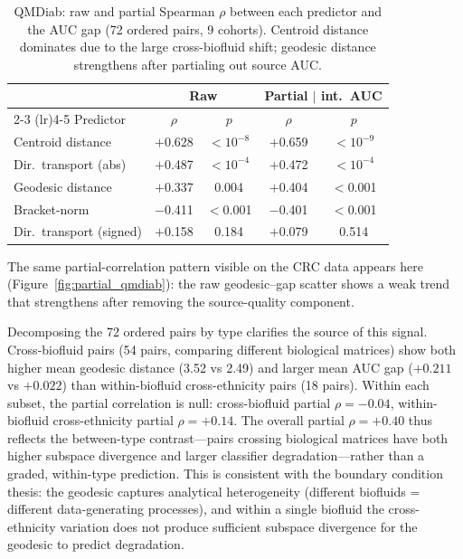 \documentclass{article}
\begin{document}
\begin{table}[t]
\centering
\caption{QMDiab: raw and partial Spearman $\rho$ between each predictor and the AUC gap (72 ordered pairs, 9 cohorts). Centroid distance dominates due to the large cross-biofluid shift; geodesic distance strengthens after partialing out source AUC.}
\label{tab:qmdiab}
\begin{tabular}{lcccc}
\toprule
 & \multicolumn{2}{c}{Raw} & \multicolumn{2}{c}{Partial $|$ int.\ AUC} \\
\cmidrule(lr){2-3} \cmidrule(lr){4-5}
Predictor & $\rho$ & $p$ & $\rho$ & $p$ \\
\midrule
Centroid distance        & $+$0.628 & $<10^{-8}$ & $+$0.659 & $<10^{-9}$ \\
Dir.\ transport (abs)    & $+$0.487 & $<10^{-4}$ & $+$0.472 & $<10^{-4}$ \\
Geodesic distance        & $+$0.337 & 0.004      & $+$0.404 & $<$0.001 \\
Bracket-norm             & $-$0.411 & $<$0.001   & $-$0.401 & $<$0.001 \\
Dir.\ transport (signed) & $+$0.158 & 0.184      & $+$0.079 & 0.514 \\
\bottomrule
\end{tabular}
\end{table}

The same partial-correlation pattern visible on the CRC data appears here (Figure~\ref{fig:partial_qmdiab}): the raw geodesic--gap scatter shows a weak trend that strengthens after removing the source-quality component.

Decomposing the 72 ordered pairs by type clarifies the source of this signal. Cross-biofluid pairs (54 pairs, comparing different biological matrices) show both higher mean geodesic distance (3.52 vs 2.49) and larger mean AUC gap ($+0.211$ vs $+0.022$) than within-biofluid cross-ethnicity pairs (18 pairs). Within each subset, the partial correlation is null: cross-biofluid partial $\rho = -0.04$, within-biofluid cross-ethnicity partial $\rho = +0.14$. The overall partial $\rho = +0.40$ thus reflects the between-type contrast---pairs crossing biological matrices have both higher subspace divergence and larger classifier degradation---rather than a graded, within-type prediction. This is consistent with the boundary condition thesis: the geodesic captures analytical heterogeneity (different biofluids = different data-generating processes), and within a single biofluid the cross-ethnicity variation does not produce sufficient subspace divergence for the geodesic to predict degradation.
\end{document}
